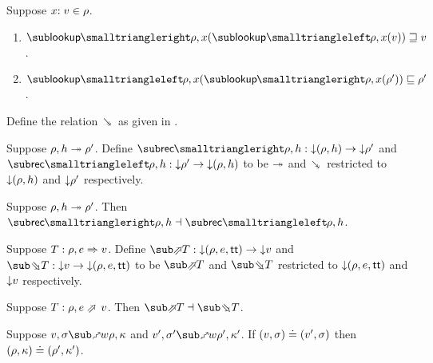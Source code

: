 \begin{lemma}
\label{lem:core-language:env-get-put}Suppose $x{:}\;v\in{\rho}$.
\begin{enumerate}
   \item \label{lem:core-language:env-get-put:1} $\envLookupFwdF{\rho,x}(\envLookupBwdF{\rho,x}(v)) \geq v$.
   \item \label{lem:core-language:env-get-put:2} $\envLookupBwdF{\rho,x}(\envLookupFwdF{\rho,x}(\rho')) \leq \rho'$.
\end{enumerate}
\end{lemma}

\begin{definition}
   \label{def:core-language:closeDefs-bwd}
   Define the relation $\closeDefsBwdR$ as given in .
\end{definition}

\begin{definition}
   Suppose $\rho, h \twoheadrightarrow \rho'$. Define $\closeDefsFwdF{\rho,h}: \Below{(\rho, h)} \to \Below{\rho'}$ and $\closeDefsBwdF{\rho,h}: \Below{\rho'} \to \Below{(\rho, h)}$ to be $\twoheadrightarrow$ and $\closeDefsBwdR$ restricted to ${\downarrow}{(\rho, h)}$ and ${\downarrow}{\rho'}$ respectively.
\end{definition}

\begin{theorem}
\label{thm:core-language:closeDefs:gc}
   Suppose $\rho, h \twoheadrightarrow \rho'$.  Then $\closeDefsFwdF{\rho,h} \adjoint \closeDefsBwdF{\rho,h}$.
\end{theorem}

\begin{definition}
   Suppose $T: \rho, e \Rightarrow v$. Define $\evalFwdF{T}: \Below{(\rho, e, \TT)} \to \Below{v}$ and $\evalBwdF{T}: \Below{v} \to \Below{(\rho, e, \TT)}$ to be $\evalFwdR{T}$ and $\evalBwdR{T}$ restricted to ${\downarrow}{(\rho, e, \mathsf{tt})}$ and ${\downarrow}{v}$ respectively.
\end{definition}

\begin{theorem}
\label{thm:core-language:eval:gc}
   Suppose $T: \rho, e \evalFwdS v$.  Then $\evalFwdF{T} \adjoint \evalBwdF{T}$.
\end{theorem}

\begin{lemma}
   Suppose $v, \sigma \matchFwdR{w} \rho, \kappa$ and $v', \sigma' \matchFwdR{w} \rho', \kappa'$. If $(v, \sigma) \doteq (v', \sigma)$ then $(\rho, \kappa) \doteq (\rho', \kappa')$.
\end{lemma}

